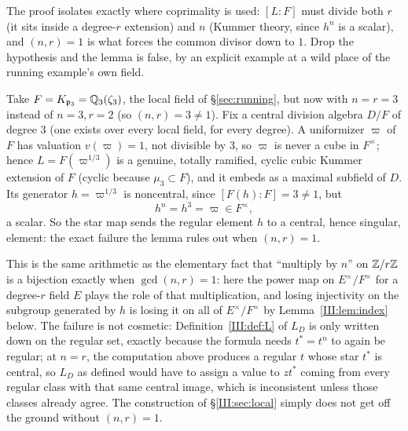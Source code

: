 \begin{remark}[Why $(n,r)=1$ cannot be dropped]\label{III:rem:coprimality-needed}
The proof isolates exactly where coprimality is used: $[L:F]$ must divide both $r$ (it sits inside a degree-$r$ extension) and $n$ (Kummer theory, since $h^n$ is a scalar), and $(n,r)=1$ is what forces the common divisor down to $1$. Drop the hypothesis and the lemma is false, by an explicit example at a wild place of the running example's own field.

Take $F=K_{\mathfrak p_3}=\mathbb{Q}_3(\zeta_3)$, the local field of \S\ref{sec:running}, but now with $n=r=3$ instead of $n=3,r=2$ (so $(n,r)=3\ne1$). Fix a central division algebra $D/F$ of degree $3$ (one exists over every local field, for every degree). A uniformizer $\varpi$ of $F$ has valuation $v(\varpi)=1$, not divisible by $3$, so $\varpi$ is never a cube in $F^\times$; hence $L=F(\varpi^{1/3})$ is a genuine, totally ramified, cyclic cubic Kummer extension of $F$ (cyclic because $\mu_3\subset F$), and it embeds as a maximal subfield of $D$. Its generator $h=\varpi^{1/3}$ is noncentral, since $[F(h):F]=3\ne1$, but
\[
h^n=h^3=\varpi\in F^\times,
\]
a scalar. So the star map sends the regular element $h$ to a central, hence singular, element: the exact failure the lemma rules out when $(n,r)=1$.

This is the same arithmetic as the elementary fact that ``multiply by $n$'' on $\mathbb Z/r\mathbb Z$ is a bijection exactly when $\gcd(n,r)=1$: here the power map on $E^\times/F^\times$ for a degree-$r$ field $E$ plays the role of that multiplication, and losing injectivity on the subgroup generated by $h$ is losing it on all of $E^\times/F^\times$ by Lemma~\ref{III:lem:index} below. The failure is not cosmetic: Definition~\ref{III:def:L} of $L_D$ is only written down on the regular set, exactly because the formula needs $t^*=t^n$ to again be regular; at $n=r$, the computation above produces a regular $t$ whose star $t^*$ is central, so $L_D$ as defined would have to assign a value to $zt^*$ coming from every regular class with that same central image, which is inconsistent unless those classes already agree. The construction of \S\ref{III:sec:local} simply does not get off the ground without $(n,r)=1$.
\end{remark}


